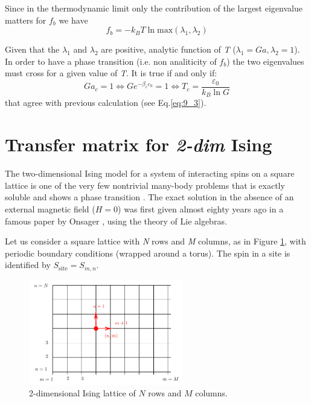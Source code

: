 \documentclass[../main/main.tex]{subfiles}
\begin{document}
Since in the thermodynamic limit only the contribution of the largest eigenvalue matters for \( f_b \) we have
\begin{equation*}
  f_b = - k_B T \ln{\text{max} (\lambda _1, \lambda _2)}
\end{equation*}
\begin{remark}
Given that the \( \lambda _1 \) and \( \lambda _2 \) are positive, analytic function of \emph{T} (\( \lambda _1 = Ga, \lambda _2=1 \)). In order to have a phase transition
(i.e. non analiticity of \( f_b \)) the two eigenvalues must cross for a given value of \emph{T}. It is true if and only if:
\begin{equation}
  G a_c =1 \Leftrightarrow G e^{-\beta _c \varepsilon _0} = 1  \Leftrightarrow T_c = \frac{\varepsilon _0}{k_B \ln{G} }
\end{equation}
that agree with previous calculation (see Eq.\eqref{eq:9_3}).
\end{remark}


\section{Transfer matrix for \emph{2-dim} Ising}
The two-dimensional Ising model for a system of interacting spins on a square lattice is one of the very few nontrivial many-body problems that is exactly soluble and shows a phase transition \cite{9_lesson_2}. 
The exact solution in the absence of an external magnetic field (\(H=0\)) was first given almost eighty years ago in a famous paper by Onsager \cite{9_lesson_1}, using the theory of Lie algebras.


Let us consider a square lattice with \emph{N} rows and \emph{M} columns, as in Figure \ref{fig:9_4}, with periodic boundary conditions (wrapped around a torus).
The spin in a site is identified by \( S_{\text{site}} = S_{m,n} \).

\begin{figure}[h!]
\centering
\includegraphics[width=0.6\textwidth]{../lessons/9_image/4.pdf}
\caption{\label{fig:9_4} 2-dimensional Ising lattice of \(N\) rows and \(M\) columns.}
\end{figure}
\end{document}
